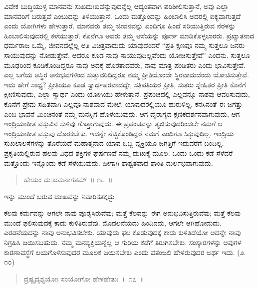 ವಿವೇಕ ಬುದ್ಧಿಯುಳ್ಳ ಮಾನವನು ಸುಖದುಃಖವೆನ್ನುವುದನ್ನೆಲ್ಲ ಆದ್ಯಂತವಾಗಿ ಪರಿಶೀಲಿಸುತ್ತಾನೆ, ಅವು ಎಲ್ಲಾ ಮಾನವರಿಗೆ ಬರುತ್ತವೆ ಎಂಬುದನ್ನು ತಿಳಿಯುತ್ತಾನೆ. ಒಂದು ಮತ್ತೊಂದನ್ನು ಹಿಂಬಾಲಿಸಿ ಅದರಲ್ಲಿ ಐಕ್ಯವಾಗುತ್ತದೆ ಎಂದು ಯೋಗಿಗಳು ಹೇಳುತ್ತಾರೆ. ಮಾನವರು ತಮ್ಮ ಜೀವನವನ್ನು ಎಂದಿಗೂ ಹಿಂದೆ ಸರಿಯುತ್ತಿರುವ ನೆರಳನ್ನು ಹಿಂಬಾಲಿಸುವುದರಲ್ಲಿ ಕಳೆಯುತ್ತಾರೆ. ಕೊನೆಗೂ ಅವರು ತಮ್ಮ ಆಸೆಯನ್ನು ಪೂರ್ಣ ಮಾಡಿಕೊಳ್ಳಲಾರರು. ಪ್ರಖ್ಯಾತನಾದ ಧರ್ಮರಾಜ ಒಮ್ಮೆ, ಜೀವನದಲ್ಲೆಲ್ಲ ಅತಿ ವಿಚಿತ್ರವಾದುದು ಯಾವುದೆಂದರೆ “ಪ್ರತಿ ಕ್ಷಣವೂ ನಮ್ಮ ಸುತ್ತಲೂ ಜನರು ಸಾಯುವುದನ್ನು ನೋಡುತ್ತೇವೆ, ಆದರೂ ಕೂಡ ನಾವು ಸಾಯುವುದಿಲ್ಲವೆಂದು ಯೋಚಿಸುತ್ತೇವೆ” ಎಂದನು. ಸುತ್ತಲೂ ಮೂಢರಿಂದ ಕೂಡಿಕೊಂಡಿದ್ದರೂ ನಾವು ಅದಕ್ಕೆ ಹೊರತಾದವರು, ನಾವು ಮಾತ್ರ ಪಂಡಿತರು ಎಂದು ಭಾವಿಸುತ್ತೇವೆ. ಎಲ್ಲ ಬಗೆಯ ಅಸ್ಥಿರ ಅನುಭವಗಳಿಂದ ಸುತ್ತುವರಿದಿದ್ದರೂ ನಮ್ಮ ಪ್ರೀತಿಯೊಂದೇ ಸ್ಥಿರವಾದುದೆಂದು ಯೋಚಿಸುತ್ತೇವೆ. ಇದು ಹೇಗೆ ಸಾಧ್ಯ? ಪ್ರೀತಿಯೂ ಕೂಡ ಸ್ವಾರ್ಥಪರವಾದದ್ದೇ, ಸತಿಪತಿಯರ ಪ್ರೀತಿ, ಸುತರು ಸ್ನೇಹಿತರ ಪ್ರೀತಿ ಕೊನೆಗೆ ಕ್ಷೀಣಿಸುವುದು, ಎಲ್ಲಾ ಸ್ವಾರ್ಥ ಎಂದು ಯೋಗಿಯು ಹೇಳುತ್ತಾನೆ. ಪ್ರಪಂಚದಲ್ಲಿ ಎಲ್ಲವನ್ನೂ ನಾಶವು ಆವರಿಸುವುದು, ಕೊನೆಗೆ ಪ್ರೇಮ ಸಹಿತವಾಗಿ ಎಲ್ಲವೂ ನಾಶವಾದ ಮೇಲೆ, ಯಾವುದರಲ್ಲಿಯೂ ಹುರುಳಿಲ್ಲ, ಕನಸಿನಂತೆ ಈ ಜಗತ್ತು ಎಂಬ ಭಾವನೆ ಮಿಂಚಿನಂತೆ ನಮ್ಮ ಮನಸ್ಸಿಗೆ ಹೊಳೆಯುವುದು. ಆಗ ವೈರಾಗ್ಯದ ಕ್ಷಣಿಕದರ್ಶನವಾಗುವುದು, ಆಗ ಇಂದ್ರಿಯಾತೀತ ವಸ್ತುವಿನ ಸುಳಿವು ಗೊತ್ತಾಗುವುದು. ಈ ಪ್ರಪಂಚವನ್ನು ತ್ಯಜಿಸುವುದರಿಂದಲೇ ನಮಗೆ ಆ ಇಂದ್ರಿಯಾತೀತ ವಸ್ತುವು ದೊರಕಬೇಕು. ಇದನ್ನೇ ನೆಚ್ಚಿಕೊಂಡಿದ್ದರೆ ನಮಗೆ ಎಂದಿಗೂ ಸಿಕ್ಕುವುದಿಲ್ಲ. ಇಂದ್ರಿಯ ಸುಖಲಾಲಸೆಗಳನ್ನು ತೊರೆಯದೆ ಮಹಾತ್ಮನಾದ ಯಾವ ಒಬ್ಬ ವ್ಯಕ್ತಿಯೂ ಜಗತ್ತಿಗೆ ಇದುವರೆಗೆ ಬಂದಿಲ್ಲ. ಪ್ರಕೃತಿಯಲ್ಲಿರುವ ಹಲವು ವಿಧದ ಶಕ್ತಿಗಳ ಘರ್ಷಣವೆ ನಮ್ಮ ದುಃಖಕ್ಕೆ ಮೂಲ. ಒಂದು ಒಂದು ಕಡೆ ಸೆಳೆದರೆ ಮತ್ತೊಂದು ಇನ್ನೊಂದು ಕಡೆ ಸೆಳೆಯುವುದು. ಹೀಗಾಗಿ ಶಾಶ್ವತವಾದ ಶಾಂತಿ ದುರ್ಲಭ\break ವಾಗುವುದು. 

\vspace{-0.3cm}

\begin{verse}
ಹೇಯಂ ದುಃಖಮನಾಗತಮ್​~॥ ೧೬~॥
\end{verse}

\vspace{-0.3cm}

ಇನ್ನು ಮುಂದೆ ಬರುವ ದುಃಖವನ್ನು ನಿವಾರಿಸತಕ್ಕದ್ದು. 

ಕೆಲವು ಕರ್ಮವನ್ನು ಆಗಲೇ ನಾವು ಪೂರೈಸಿರುವೆವು; ಮತ್ತೆ ಕೆಲವನ್ನು ಈಗ ಅನುಭವಿಸುತ್ತಿರುವೆವು; ಮತ್ತೆ ಕೆಲವು ಮುಂದೆ ಫಲಿಸುವುದಕ್ಕೆ ಕಾದು ಕುಳಿತಿರುವೆವು. ಮೊದಲನೆಯದು ಹಿಂದಿನದು, ಆಗಲೇ ಆಗಿಹೋದುದು. ಎರಡನೆಯದನ್ನು ನಾವು ಅನುಭವಿಸಬೇಕು. ಯಾವುದು ಫಲ ಕೊಡುವುದಕ್ಕೆ ಕಾದು ಕುಳಿತಿದೆಯೋ ಅದನ್ನೇ ನಾವು ನಿಗ್ರಹಿಸಿ ಜಯಿಸಬಹುದು. ನಮ್ಮ ಮನಶ್ಯಕ್ತಿಯನ್ನೆಲ್ಲ ಆ ಗುರಿಯ ಕಡೆಗೆ ತಿರುಗಿಸಬೇಕು. ಸಂಸ್ಕಾರಗಳನ್ನು ಅವುಗಳ ಕಾರಣಾವಸ್ಥೆಗೆ ಲಯಗೊಳಿಸುವುದರ ಮೂಲಕ ಜಯಿಸಬೇಕು ಎಂದು ಪತಂಜಲಿ ಹೇಳಿರುವುದರ ಅರ್ಥ ಇದು. (೨. ೧೦)


\begin{verse}
ದ್ರಷ್ಟೃದೃಶ್ಯಯೋಃ ಸಂಯೋಗೋ ಹೇಳಹೇತುಃ~॥ ೧೭~॥
\end{verse}

